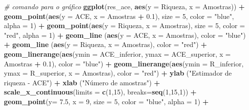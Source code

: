 \documentclass[
]{book}
\newenvironment{Shaded}{\begin{snugshade}}{\end{snugshade}}
\newcommand{\CommentTok}[1]{\textcolor[rgb]{0.56,0.35,0.01}{\textit{#1}}}
\newcommand{\DataTypeTok}[1]{\textcolor[rgb]{0.13,0.29,0.53}{#1}}
\newcommand{\DecValTok}[1]{\textcolor[rgb]{0.00,0.00,0.81}{#1}}
\newcommand{\FloatTok}[1]{\textcolor[rgb]{0.00,0.00,0.81}{#1}}
\newcommand{\KeywordTok}[1]{\textcolor[rgb]{0.13,0.29,0.53}{\textbf{#1}}}
\newcommand{\NormalTok}[1]{#1}
\newcommand{\OperatorTok}[1]{\textcolor[rgb]{0.81,0.36,0.00}{\textbf{#1}}}
\newcommand{\StringTok}[1]{\textcolor[rgb]{0.31,0.60,0.02}{#1}}
\begin{document}
\begin{Shaded}
\begin{Highlighting}[]
\CommentTok{# comando para o gráfico}
\KeywordTok{ggplot}\NormalTok{(res_ace, }\KeywordTok{aes}\NormalTok{(}\DataTypeTok{y =}\NormalTok{ Riqueza, }\DataTypeTok{x =}\NormalTok{ Amostras)) }\OperatorTok{+}
\StringTok{  }\KeywordTok{geom_point}\NormalTok{(}\KeywordTok{aes}\NormalTok{(}\DataTypeTok{y =}\NormalTok{ ACE, }\DataTypeTok{x =}\NormalTok{ Amostras }\OperatorTok{+}\StringTok{ }\FloatTok{0.1}\NormalTok{), }\DataTypeTok{size =} \DecValTok{5}\NormalTok{, }\DataTypeTok{color =} \StringTok{"blue"}\NormalTok{, }\DataTypeTok{alpha =} \DecValTok{1}\NormalTok{) }\OperatorTok{+}
\StringTok{  }\KeywordTok{geom_point}\NormalTok{(}\KeywordTok{aes}\NormalTok{(}\DataTypeTok{y =}\NormalTok{ Riqueza, }\DataTypeTok{x =}\NormalTok{ Amostras), }\DataTypeTok{size =} \DecValTok{5}\NormalTok{, }\DataTypeTok{color =} \StringTok{"red"}\NormalTok{, }\DataTypeTok{alpha =} \DecValTok{1}\NormalTok{) }\OperatorTok{+}
\StringTok{  }\KeywordTok{geom_line}\NormalTok{ (}\KeywordTok{aes}\NormalTok{(}\DataTypeTok{y =}\NormalTok{ ACE, }\DataTypeTok{x =}\NormalTok{ Amostras), }\DataTypeTok{color =} \StringTok{"blue"}\NormalTok{) }\OperatorTok{+}
\StringTok{  }\KeywordTok{geom_line}\NormalTok{ (}\KeywordTok{aes}\NormalTok{(}\DataTypeTok{y =}\NormalTok{ Riqueza, }\DataTypeTok{x =}\NormalTok{ Amostras), }\DataTypeTok{color =} \StringTok{"red"}\NormalTok{) }\OperatorTok{+}
\StringTok{  }\KeywordTok{geom_linerange}\NormalTok{(}\KeywordTok{aes}\NormalTok{(}\DataTypeTok{ymin =}\NormalTok{ ACE_inferior, }\DataTypeTok{ymax =}\NormalTok{ ACE_superior, }\DataTypeTok{x =}\NormalTok{ Amostras }\OperatorTok{+}\StringTok{ }\FloatTok{0.1}\NormalTok{),}
 \DataTypeTok{color =} \StringTok{"blue"}\NormalTok{) }\OperatorTok{+}
\StringTok{  }\KeywordTok{geom_linerange}\NormalTok{(}\KeywordTok{aes}\NormalTok{(}\DataTypeTok{ymin =}\NormalTok{ R_inferior, }\DataTypeTok{ymax =}\NormalTok{ R_superior, }\DataTypeTok{x =}\NormalTok{ Amostras), }\DataTypeTok{color =} \StringTok{"red"}\NormalTok{) }\OperatorTok{+}
\StringTok{  }\KeywordTok{ylab}\NormalTok{ (}\StringTok{"Estimador de riqueza - ACE"}\NormalTok{) }\OperatorTok{+}
\StringTok{  }\KeywordTok{xlab}\NormalTok{ (}\StringTok{"Número de amostras"}\NormalTok{) }\OperatorTok{+}
\StringTok{  }\KeywordTok{scale_x_continuous}\NormalTok{(}\DataTypeTok{limits =} \KeywordTok{c}\NormalTok{(}\DecValTok{1}\NormalTok{,}\DecValTok{15}\NormalTok{), }\DataTypeTok{breaks=}\KeywordTok{seq}\NormalTok{(}\DecValTok{1}\NormalTok{,}\DecValTok{15}\NormalTok{,}\DecValTok{1}\NormalTok{)) }\OperatorTok{+}
\StringTok{  }\KeywordTok{geom_point}\NormalTok{(}\DataTypeTok{y=} \FloatTok{7.5}\NormalTok{, }\DataTypeTok{x =} \DecValTok{9}\NormalTok{, }\DataTypeTok{size =} \DecValTok{5}\NormalTok{, }\DataTypeTok{color =} \StringTok{"blue"}\NormalTok{, }\DataTypeTok{alpha =} \DecValTok{1}\NormalTok{) }\OperatorTok{+}\StringTok{ }

\end{Highlighting}
\end{Shaded}
\end{document}
